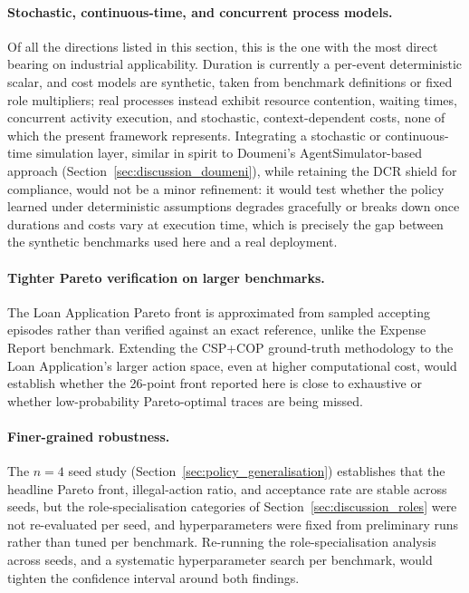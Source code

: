\paragraph{Stochastic, continuous-time, and concurrent process models.} Of all the directions listed in this section, this is the one with the most direct bearing on industrial applicability. Duration is currently a per-event deterministic scalar, and cost models are synthetic, taken from benchmark definitions or fixed role multipliers; real processes instead exhibit resource contention, waiting times, concurrent activity execution, and stochastic, context-dependent costs, none of which the present framework represents. Integrating a stochastic or continuous-time simulation layer, similar in spirit to Doumeni's AgentSimulator-based approach (Section~\ref{sec:discussion_doumeni}), while retaining the \ac{DCR} shield for compliance, would not be a minor refinement: it would test whether the policy learned under deterministic assumptions degrades gracefully or breaks down once durations and costs vary at execution time, which is precisely the gap between the synthetic benchmarks used here and a real deployment.

\paragraph{Tighter Pareto verification on larger benchmarks.} The Loan Application Pareto front is approximated from sampled accepting episodes rather than verified against an exact reference, unlike the Expense Report benchmark. Extending the CSP+COP ground-truth methodology to the Loan Application's larger action space, even at higher computational cost, would establish whether the 26-point front reported here is close to exhaustive or whether low-probability Pareto-optimal traces are being missed.

\paragraph{Finer-grained robustness.} The $n=4$ seed study (Section~\ref{sec:policy_generalisation}) establishes that the headline Pareto front, illegal-action ratio, and acceptance rate are stable across seeds, but the role-specialisation categories of Section~\ref{sec:discussion_roles} were not re-evaluated per seed, and hyperparameters were fixed from preliminary runs rather than tuned per benchmark. Re-running the role-specialisation analysis across seeds, and a systematic hyperparameter search per benchmark, would tighten the confidence interval around both findings.

